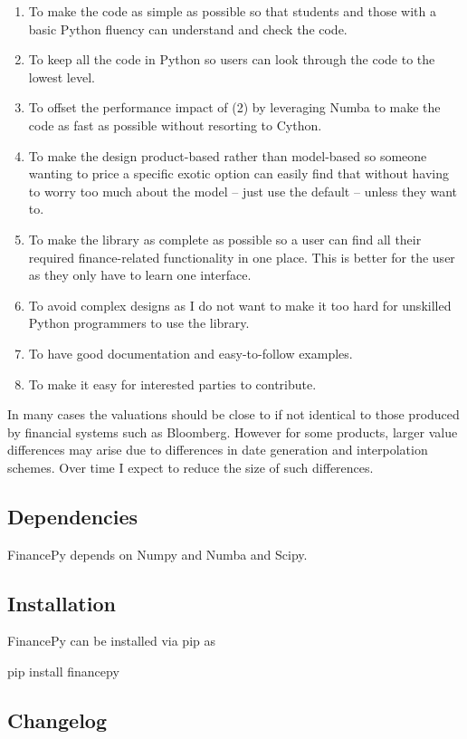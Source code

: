 \documentclass[twoside,11pt]{book}
\begin{document}
\begin{enumerate}
\item{ To make the code as simple as possible so that students and those with a basic Python fluency can understand and check the code.
}
\item{ To keep all the code in Python so users can look through the code to the lowest level.
}
\item{ To offset the performance impact of (2) by leveraging Numba to make the code as fast as possible without resorting to Cython.
}
\item{ To make the design product-based rather than model-based so someone wanting to price a specific exotic option can easily find that without having to worry too much about the model – just use the default – unless they want to.
}
\item{ To make the library as complete as possible so a user can find all their required finance-related functionality in one place. This is better for the user as they only have to learn one interface.
}
\item{ To avoid complex designs as I do not want to make it too hard for unskilled Python programmers to use the library.
}
\item{ To have good documentation and easy-to-follow examples.
}
\item{ To make it easy for interested parties to contribute.
}
\end{enumerate}

In many cases the valuations should be close to if not identical to those produced by financial systems such as Bloomberg. However for some products, larger value differences may arise due to differences in date generation and interpolation schemes. Over time I expect to reduce the size of such differences.


\subsection*{Dependencies}

FinancePy depends on Numpy and Numba and Scipy.


\subsection*{Installation}

FinancePy can be installed via pip as

pip install financepy


\subsection*{Changelog}
\end{document}
